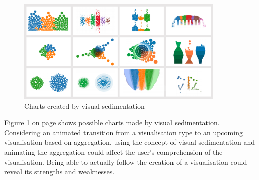\begin{figure}[!htb]
\centering
\includegraphics[height=5cm]{images/methods/related/visual-sedimentation}
\caption[
    Charts created by visual sedimentation .
]{Charts created by visual sedimentation}
\label{fig:visual-sedimentation}
\end{figure}
\cbstart
Figure \ref{fig:visual-sedimentation} on page \pageref{fig:visual-sedimentation} shows possible charts made by visual sedimentation. Considering an animated transition from a visualisation type to an upcoming visualisation based on aggregation, using the concept of visual sedimentation and animating the aggregation could affect the user's comprehension of the visualisation. Being able to actually follow the creation of a visualisation could reveal its strengths and weaknesses.
\cbend